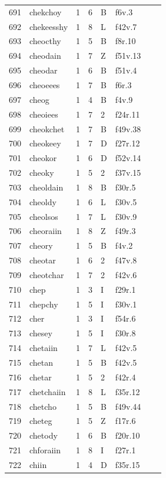 \documentclass[11pt,a4paper]{article}
\begin{document}
\begin{landscape}
\begin{longtable}{@{}r>{\ttfamily}lrrl>{\ttfamily}l>{\raggedright\arraybackslash}p{80mm}>{\raggedright\arraybackslash}p{36mm}@{}}
691 & chekchoy & 1 & 6 & B & f6v.3 &  & \\
692 & chekeesshy & 1 & 8 & L & f42v.7 &  & \\
693 & cheocthy & 1 & 5 & B & f8r.10 &  & \\
694 & cheodain & 1 & 7 & Z & f51v.13 &  & \\
695 & cheodar & 1 & 6 & B & f51v.4 &  & \\
696 & cheoeees & 1 & 7 & B & f6r.3 &  & \\
697 & cheog & 1 & 4 & B & f4v.9 &  & \\
698 & cheoiees & 1 & 7 & 2 & f24r.11 &  & \\
699 & cheokchet & 1 & 7 & B & f49v.38 &  & \\
700 & cheokeey & 1 & 7 & D & f27r.12 &  & \\
701 & cheokor & 1 & 6 & D & f52v.14 &  & \\
702 & cheoky & 1 & 5 & 2 & f37v.15 &  & \\
703 & cheoldain & 1 & 8 & B & f30r.5 &  & \\
704 & cheoldy & 1 & 6 & L & f30v.5 &  & \\
705 & cheolsos & 1 & 7 & L & f30v.9 &  & \\
706 & cheoraiin & 1 & 8 & Z & f49r.3 &  & \\
707 & cheory & 1 & 5 & B & f4v.2 &  & \\
708 & cheotar & 1 & 6 & 2 & f47v.8 &  & \\
709 & cheotchar & 1 & 7 & 2 & f42v.6 &  & \\
710 & chep & 1 & 3 & I & f29r.1 &  & \\
711 & chepchy & 1 & 5 & I & f30v.1 &  & \\
712 & cher & 1 & 3 & I & f54r.6 &  & \\
713 & chesey & 1 & 5 & I & f30r.8 &  & \\
714 & chetaiin & 1 & 7 & L & f42v.5 &  & \\
715 & chetan & 1 & 5 & B & f42v.5 &  & \\
716 & chetar & 1 & 5 & 2 & f42r.4 &  & \\
717 & chetchaiin & 1 & 8 & L & f35r.12 &  & \\
718 & chetcho & 1 & 5 & B & f49v.44 &  & \\
719 & cheteg & 1 & 5 & Z & f17r.6 &  & \\
720 & chetody & 1 & 6 & B & f20r.10 &  & \\
721 & chforaiin & 1 & 8 & I & f27r.1 &  & \\
722 & chiin & 1 & 4 & D & f35r.15 &  & \\

\end{longtable}
\end{landscape}
\end{document}

